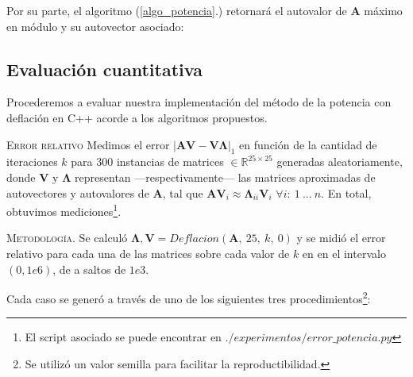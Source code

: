 \vspace{2em}
\noindent Por su parte, el algoritmo (\ref{algo_potencia}.) retornará el autovalor de \textbf{A} máximo en módulo y su autovector asociado:

\vspace{1em}


\vspace{1em}






\vspace{2em}
\subsection{Evaluación cuantitativa} Procederemos a evaluar nuestra implementación del método de la potencia con deflación en C++ acorde a los algoritmos propuestos.

\vspace{1em}
\textsc{Error relativo} Medimos el error $|\mathbf{A} \mathbf{V} - \mathbf{V} \mathbf{\Lambda}|_1$ en función de la cantidad de iteraciones $k$ para 300 instancias de matrices $\in \mathbb{R}^{25 \times 25}$ generadas aleatoriamente, donde \textbf{V} y $\mathbf{\Lambda}$ representan ---respectivamente--- las matrices aproximadas de autovectores y autovalores de \textbf{A}, tal que $\mathbf{A}\mathbf{V}_i \approx \mathbf{\Lambda}_{ii} \mathbf{V}_i$ $\forall i:\ 1\ ...\ n$.  En total, obtuvimos  mediciones\footnote{El script asociado se puede encontrar en $./experimentos/error\_potencia.py$}.  


\vspace{1em}
\noindent \textsc{Metodología}. Se calculó  $\mathbf{\Lambda}, \mathbf{V} = Deflacion(\mathbf{A},\ 25,\ k,\ 0)$ y se midió el error relativo para cada una de las matrices sobre cada valor de $k$ en en el intervalo $(0, 1e6)$, de a saltos de $1e3$.

\vspace{1em}
\noindent Cada caso se generó a través de uno de los siguientes tres procedimientos\footnote{Se utilizó un valor semilla para facilitar la reproductibilidad.}:

